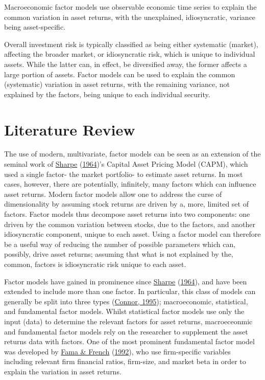 \documentclass[11pt,preprint, authoryear]{elsarticle}
\numberwithin{equation}{section}
\numberwithin{figure}{section}
\numberwithin{table}{section}
\begin{document}
Macroeconomic factor models use observable economic time series to
explain the common variation in asset returns, with the unexplained,
idiosyncratic, variance being asset-specific.

Overall investment risk is typically classified as being either
systematic (market), affecting the broader market, or idiosyncratic
risk, which is unique to individual assets. While the latter can, in
effect, be diversified away, the former affects a large portion of
assets. Factor models can be used to explain the common (systematic)
variation in asset returns, with the remaining variance, not explained
by the factors, being unique to each individual security.

\hypertarget{literature-review}{%
\section{\texorpdfstring{Literature Review
\label{Lit}}{Literature Review }}\label{literature-review}}

The use of modern, multivariate, factor models can be seen as an
extension of the seminal work of
\protect\hyperlink{ref-Sharpe1964}{Sharpe}
(\protect\hyperlink{ref-Sharpe1964}{1964})'s Capital Asset Pricing Model
(CAPM), which used a single factor- the market portfolio- to estimate
asset returns. In most cases, however, there are potentially,
infinitely, many factors which can influence asset returns. Modern
factor models allow one to address the curse of dimensionality by
assuming stock returns are driven by a, more, limited set of factors.
Factor models thus decompose asset returns into two components: one
driven by the common variation between stocks, due to the factors, and
another idiosyncratic component, unique to each asset. Using a factor
model can therefore be a useful way of reducing the number of possible
parameters which can, possibly, drive asset returns; assuming that what
is not explained by the, common, factors is idiosyncratic risk unique to
each asset.

Factor models have gained in prominence since
\protect\hyperlink{ref-Sharpe1964}{Sharpe}
(\protect\hyperlink{ref-Sharpe1964}{1964}), and have been extended to
include more than one factor. In particular, this class of models can
generally be split into three types
(\protect\hyperlink{ref-Connor}{Connor, 1995}); macroeconomic,
statistical, and fundamental factor models. Whilst statistical factor
models use only the input (data) to determine the relevant factors for
asset returns, macroeceonmic and fundamental factor models rely on the
researcher to supplement the asset returns data with factors. One of the
most prominent fundamental factor model was developed by
\protect\hyperlink{ref-Fama1992}{Fama \& French}
(\protect\hyperlink{ref-Fama1992}{1992}), who use firm-specific
variables including relevant firm financial ratios, firm-size, and
market beta in order to explain the variation in asset returns.
\end{document}
